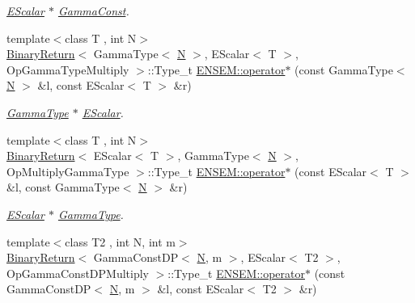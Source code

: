 \begin{DoxyCompactItemize}
\begin{DoxyCompactList}\small\item\em \mbox{\hyperlink{classENSEM_1_1EScalar}{E\+Scalar}} $\ast$ \mbox{\hyperlink{classENSEM_1_1GammaConst}{Gamma\+Const}}. \end{DoxyCompactList}\item 
{\footnotesize template$<$class T , int N$>$ }\\\mbox{\hyperlink{structBinaryReturn}{Binary\+Return}}$<$ Gamma\+Type$<$ \mbox{\hyperlink{adat__devel_2lib_2hadron_2operator__name__util_8cc_a7722c8ecbb62d99aee7ce68b1752f337}{N}} $>$, E\+Scalar$<$ T $>$, Op\+Gamma\+Type\+Multiply $>$\+::Type\+\_\+t \mbox{\hyperlink{group__escalar_ga53bf11728d0f1f7fb9dea51cd221792d}{E\+N\+S\+E\+M\+::operator$\ast$}} (const Gamma\+Type$<$ \mbox{\hyperlink{adat__devel_2lib_2hadron_2operator__name__util_8cc_a7722c8ecbb62d99aee7ce68b1752f337}{N}} $>$ \&l, const E\+Scalar$<$ T $>$ \&r)
\begin{DoxyCompactList}\small\item\em \mbox{\hyperlink{classENSEM_1_1GammaType}{Gamma\+Type}} $\ast$ \mbox{\hyperlink{classENSEM_1_1EScalar}{E\+Scalar}}. \end{DoxyCompactList}\item 
{\footnotesize template$<$class T , int N$>$ }\\\mbox{\hyperlink{structBinaryReturn}{Binary\+Return}}$<$ E\+Scalar$<$ T $>$, Gamma\+Type$<$ \mbox{\hyperlink{adat__devel_2lib_2hadron_2operator__name__util_8cc_a7722c8ecbb62d99aee7ce68b1752f337}{N}} $>$, Op\+Multiply\+Gamma\+Type $>$\+::Type\+\_\+t \mbox{\hyperlink{group__escalar_gacd3a5ba72921d671ee94910188b8c179}{E\+N\+S\+E\+M\+::operator$\ast$}} (const E\+Scalar$<$ T $>$ \&l, const Gamma\+Type$<$ \mbox{\hyperlink{adat__devel_2lib_2hadron_2operator__name__util_8cc_a7722c8ecbb62d99aee7ce68b1752f337}{N}} $>$ \&r)
\begin{DoxyCompactList}\small\item\em \mbox{\hyperlink{classENSEM_1_1EScalar}{E\+Scalar}} $\ast$ \mbox{\hyperlink{classENSEM_1_1GammaType}{Gamma\+Type}}. \end{DoxyCompactList}\item 
{\footnotesize template$<$class T2 , int N, int m$>$ }\\\mbox{\hyperlink{structBinaryReturn}{Binary\+Return}}$<$ Gamma\+Const\+DP$<$ \mbox{\hyperlink{adat__devel_2lib_2hadron_2operator__name__util_8cc_a7722c8ecbb62d99aee7ce68b1752f337}{N}}, m $>$, E\+Scalar$<$ T2 $>$, Op\+Gamma\+Const\+D\+P\+Multiply $>$\+::Type\+\_\+t \mbox{\hyperlink{group__escalar_ga37b9d878f5157952ec965d47a1032bc0}{E\+N\+S\+E\+M\+::operator$\ast$}} (const Gamma\+Const\+DP$<$ \mbox{\hyperlink{adat__devel_2lib_2hadron_2operator__name__util_8cc_a7722c8ecbb62d99aee7ce68b1752f337}{N}}, m $>$ \&l, const E\+Scalar$<$ T2 $>$ \&r)

\end{DoxyCompactItemize}
